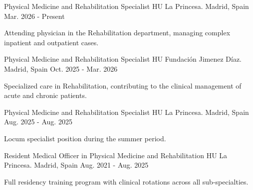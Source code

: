 

\begin{cventries}

  \cventry
    {Physical Medicine and Rehabilitation Specialist} %
    {HU La Princesa.} %
    {Madrid, Spain} %
    {Mar. 2026 - Present} %
    {
      \begin{cvitems} %
        \item {Attending physician in the Rehabilitation department, managing complex inpatient and outpatient cases.}
      \end{cvitems}
    }

  \cventry
    {Physical Medicine and Rehabilitation Specialist} %
    {HU Fundación Jimenez Díaz.} %
    {Madrid, Spain} %
    {Oct. 2025 - Mar. 2026} %
    {
      \begin{cvitems} %
        \item {Specialized care in Rehabilitation, contributing to the clinical management of acute and chronic patients.}
      \end{cvitems}
    }

  \cventry
    {Physical Medicine and Rehabilitation Specialist} %
    {HU La Princesa.} %
    {Madrid, Spain} %
    {Aug. 2025 - Aug. 2025} %
    {
      \begin{cvitems} %
        \item {Locum specialist position during the summer period.}
      \end{cvitems}
    }

  \cventry
    {Resident Medical Officer in Physical Medicine and Rehabilitation} %
    {HU La Princesa.} %
    {Madrid, Spain} %
    {Aug. 2021 - Aug. 2025} %
    {
      \begin{cvitems} %
        \item {Full residency training program with clinical rotations across all sub-specialties.}
      \end{cvitems}
    }


\end{cventries}
